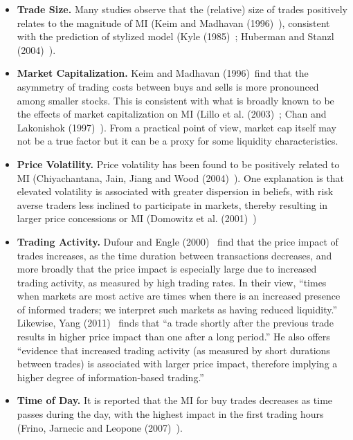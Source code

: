 \begin{itemize}
\item \textbf{Trade Size.} Many studies observe that the (relative) size of trades positively relates to the magnitude of MI (Keim and Madhavan (1996)~\cite{madhavan}), consistent with the prediction of stylized model (Kyle (1985)~\cite{kyle1985}; Huberman and Stanzl (2004)~\cite{huberstan}).

\item \textbf{Market Capitalization.} Keim and Madhavan (1996)~\cite{keim1996}find that the asymmetry of trading costs between buys and sells is more pronounced among smaller stocks. This is consistent with what is broadly known to be the effects of market capitalization on MI (Lillo et al. (2003)~\cite{farmermantegna}; Chan and Lakonishok (1997)~\cite{chan1997}). From a practical point of view, market cap itself may not be a true factor but it can be a proxy for some liquidity characteristics. 

\item \textbf{Price Volatility.} Price volatility has been found to be positively related to MI (Chiyachantana, Jain, Jiang and Wood (2004)~\cite{chiya2004}). One explanation is that elevated volatility is associated with greater dispersion in beliefs, with risk averse traders less inclined to participate in markets, thereby resulting in larger price concessions or MI (Domowitz et al. (2001)~\cite{domo2001})

\item \textbf{Trading Activity.} Dufour and Engle (2000)~\cite[p. 2467]{dufour} find that the price impact of trades increases, as the time duration between transactions decreases, and more broadly that the price impact is especially large due to increased trading activity, as measured by high trading rates. In their view, ``times when markets are most active are times when there is an increased presence of informed traders; we interpret such markets as having reduced liquidity.'' Likewise, Yang (2011)~\cite[p.91]{yang2011} finds that ``a trade shortly after the previous trade results in higher price impact than one after a long period.'' He also offers ``evidence that increased trading activity (as measured by short durations between trades) is associated with larger price impact, therefore implying a higher degree of information-based trading.''

\item \textbf{Time of Day.} It is reported that the MI for buy trades decreases as time passes during the day, with the highest impact in the first trading hours (Frino, Jarnecic and Leopone (2007)~\cite{frino}).
\end{itemize}


